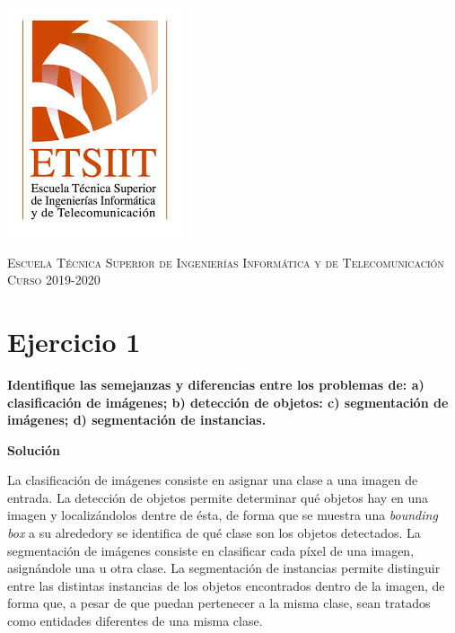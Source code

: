 \documentclass[11pt,a4paper]{article}
\newcommand{\answer}{\noindent\textbf{Solución}}
\newcommand{\question}[1]{\noindent\textbf{#1}}
\newcommand{\nonumsection}[1]{\section*{#1}\addcontentsline{toc}{section}{#1}}
\begin{document}
\begin{titlepage}
\begin{minipage}{\textwidth}
\includegraphics[scale=0.3]{img/etsiit.jpeg}

\vspace{0.7cm}
\textsc{Escuela Técnica Superior de Ingenierías Informática y de Telecomunicación}\\
\vspace{1cm}
\textsc{Curso 2019-2020}
\end{minipage}
\end{titlepage}

\tableofcontents
\thispagestyle{empty}				%

\newpage

\setlength{\parskip}{1em}

\nonumsection{Ejercicio 1}

\question{Identifique las semejanzas y diferencias entre los problemas
de: a) clasificación de imágenes; b) detección de objetos: c)
segmentación de imágenes; d) segmentación de instancias.}

\answer

La clasificación de imágenes consiste en asignar una clase a una imagen
de entrada. La detección de objetos permite determinar qué objetos hay
en una imagen y localizándolos dentre de ésta, de forma que se muestra una
\textit{bounding box} a su alrededory se identifica
de qué clase son los objetos detectados. La segmentación de imágenes consiste
en clasificar cada píxel de una imagen, asignándole una u otra clase. La
segmentación de instancias permite distinguir entre las distintas instancias
de los objetos encontrados dentro de la imagen, de forma que, a pesar de que
puedan pertenecer a la misma clase, sean tratados como entidades diferentes de
una misma clase.
\end{document}
